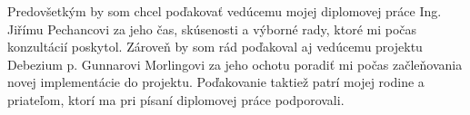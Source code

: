 
	\acknowledgements
	\noindent
Predovšetkým by som chcel poďakovať vedúcemu mojej diplomovej práce Ing. Jiřímu Pechancovi za jeho čas, skúsenosti a výborné rady, ktoré mi počas konzultácií poskytol. Zároveň by som rád poďakoval aj vedúcemu projektu Debezium p. Gunnarovi Morlingovi za jeho ochotu poradiť mi počas začleňovania novej implementácie do projektu. Poďakovanie taktiež patrí mojej rodine a priateľom, ktorí ma pri písaní diplomovej práce podporovali.
